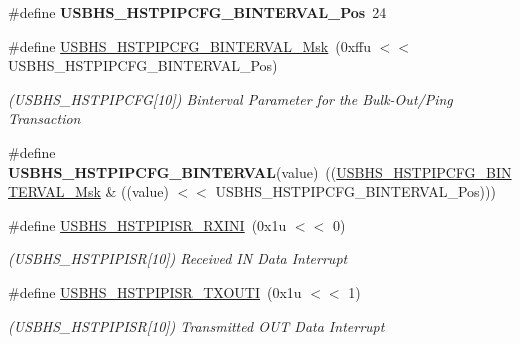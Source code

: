 \begin{DoxyCompactItemize}
\mbox{\label{group__SAMV71__USBHS_ga296398192bdd3d809eaa7b87256f23de}} 
\#define {\bfseries U\+S\+B\+H\+S\+\_\+\+H\+S\+T\+P\+I\+P\+C\+F\+G\+\_\+\+B\+I\+N\+T\+E\+R\+V\+A\+L\+\_\+\+Pos}~24
\item 
\mbox{\label{group__SAMV71__USBHS_gaedc9c4e67bfc7cc3d61e05ad12d33253}} 
\#define \mbox{\hyperlink{group__SAMV71__USBHS_gaedc9c4e67bfc7cc3d61e05ad12d33253}{U\+S\+B\+H\+S\+\_\+\+H\+S\+T\+P\+I\+P\+C\+F\+G\+\_\+\+B\+I\+N\+T\+E\+R\+V\+A\+L\+\_\+\+Msk}}~(0xffu $<$$<$ U\+S\+B\+H\+S\+\_\+\+H\+S\+T\+P\+I\+P\+C\+F\+G\+\_\+\+B\+I\+N\+T\+E\+R\+V\+A\+L\+\_\+\+Pos)
\begin{DoxyCompactList}\small\item\em (U\+S\+B\+H\+S\+\_\+\+H\+S\+T\+P\+I\+P\+C\+FG\mbox{[}10\mbox{]}) Binterval Parameter for the Bulk-\/\+Out/\+Ping Transaction \end{DoxyCompactList}\item 
\mbox{\label{group__SAMV71__USBHS_ga9dfcf332f4e592710da5e84377e52306}} 
\#define {\bfseries U\+S\+B\+H\+S\+\_\+\+H\+S\+T\+P\+I\+P\+C\+F\+G\+\_\+\+B\+I\+N\+T\+E\+R\+V\+AL}(value)~((\mbox{\hyperlink{group__SAMV71__USBHS_gaedc9c4e67bfc7cc3d61e05ad12d33253}{U\+S\+B\+H\+S\+\_\+\+H\+S\+T\+P\+I\+P\+C\+F\+G\+\_\+\+B\+I\+N\+T\+E\+R\+V\+A\+L\+\_\+\+Msk}} \& ((value) $<$$<$ U\+S\+B\+H\+S\+\_\+\+H\+S\+T\+P\+I\+P\+C\+F\+G\+\_\+\+B\+I\+N\+T\+E\+R\+V\+A\+L\+\_\+\+Pos)))
\item 
\mbox{\label{group__SAMV71__USBHS_gabd4bff53529d3a63d2f2a6b288ea4404}} 
\#define \mbox{\hyperlink{group__SAMV71__USBHS_gabd4bff53529d3a63d2f2a6b288ea4404}{U\+S\+B\+H\+S\+\_\+\+H\+S\+T\+P\+I\+P\+I\+S\+R\+\_\+\+R\+X\+I\+NI}}~(0x1u $<$$<$ 0)
\begin{DoxyCompactList}\small\item\em (U\+S\+B\+H\+S\+\_\+\+H\+S\+T\+P\+I\+P\+I\+SR\mbox{[}10\mbox{]}) Received IN Data Interrupt \end{DoxyCompactList}\item 
\mbox{\label{group__SAMV71__USBHS_gab412d773f75086777987bce75d9c2c79}} 
\#define \mbox{\hyperlink{group__SAMV71__USBHS_gab412d773f75086777987bce75d9c2c79}{U\+S\+B\+H\+S\+\_\+\+H\+S\+T\+P\+I\+P\+I\+S\+R\+\_\+\+T\+X\+O\+U\+TI}}~(0x1u $<$$<$ 1)
\begin{DoxyCompactList}\small\item\em (U\+S\+B\+H\+S\+\_\+\+H\+S\+T\+P\+I\+P\+I\+SR\mbox{[}10\mbox{]}) Transmitted O\+UT Data Interrupt \end{DoxyCompactList}\item 

\end{DoxyCompactItemize}
